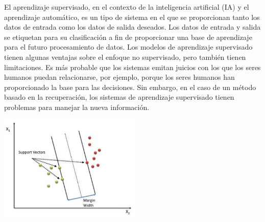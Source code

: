 El aprendizaje supervisado, en el contexto de la inteligencia artificial (IA) y el aprendizaje automático, es un tipo de sistema en el que se proporcionan tanto los datos de entrada como los datos de salida deseados. Los datos de entrada y salida se etiquetan para su clasificación a fin de proporcionar una base de aprendizaje para el futuro procesamiento de datos. Los modelos de aprendizaje supervisado tienen algunas ventajas sobre el enfoque no supervisado, pero también tienen limitaciones. Es más probable que los sistemas emitan juicios con los que los seres humanos puedan relacionarse, por ejemplo, porque los seres humanos han proporcionado la base para las decisiones. Sin embargo, en el caso de un método basado en la recuperación, los sistemas de aprendizaje supervisado tienen problemas para manejar la nueva información. 
\begin{center}
\includegraphics[height=2.0in]{figuras/Capture3.PNG}
\end{center}

